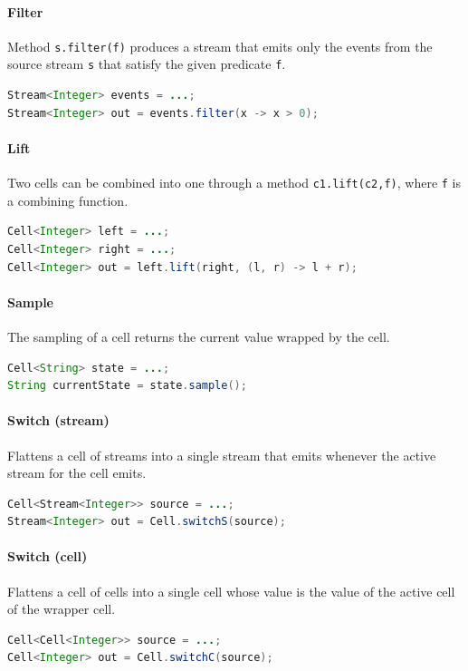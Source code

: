 \paragraph{Filter}
Method \texttt{s.filter(f)} produces a stream that emits only the events from the source stream \texttt{s} that satisfy the given predicate \texttt{f}.
%
\begin{lstlisting}[frame=single, language=java]
Stream<Integer> events = ...;
Stream<Integer> out = events.filter(x -> x > 0);
\end{lstlisting}

\paragraph{Lift}
Two cells can be combined into one through a method \lstinline[breaklines=true]|c1.lift(c2,f)|, where \texttt{f} is a combining function.
%
\begin{lstlisting}[frame=single, language=java]
Cell<Integer> left = ...;
Cell<Integer> right = ...;
Cell<Integer> out = left.lift(right, (l, r) -> l + r);
\end{lstlisting}

\paragraph{Sample}
The sampling of a cell returns the current value wrapped by the cell.
%
\begin{lstlisting}[frame=single, language=java]
Cell<String> state = ...;
String currentState = state.sample();
\end{lstlisting}
  
\paragraph{Switch (stream)}
Flattens a cell of streams into a single stream that emits whenever the active stream for the cell emits.
%
\begin{lstlisting}[frame=single, language=java]
Cell<Stream<Integer>> source = ...;
Stream<Integer> out = Cell.switchS(source);
\end{lstlisting}
%
\paragraph{Switch (cell)}
Flattens a cell of cells into a single cell whose value is the value of the active cell of the wrapper cell.
\begin{lstlisting}[frame=single, language=java]
Cell<Cell<Integer>> source = ...;
Cell<Integer> out = Cell.switchC(source);
\end{lstlisting}

